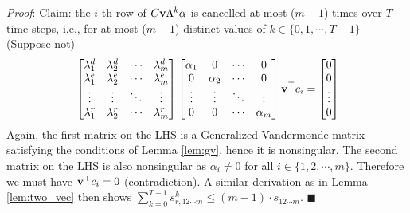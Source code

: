 \documentclass[../thesis.tex]{subfiles}
\begin{document}
\textit{Proof}:
Claim: the $i$-th row of $C{\bf v}\Lambda^k \alpha$ is cancelled at most ($m-1$) times over $T$ time steps, i.e., for at most ($m-1$) distinct values of $k \in \{0, 1, \cdots, T-1\}$
(Suppose not)
\begin{equation}
\begin{aligned}
	&	%
		\begin{bmatrix} \lambda_1^d & \lambda_2^d & \cdots & \lambda_m^d \\
					\lambda_1^e & \lambda_2^e & \cdots & \lambda_m^e \\
					\vdots & \vdots & \ddots & \vdots \\
					\lambda_1^r& \lambda_2^r & \cdots & \lambda_m^r 
		\end{bmatrix} %
		\begin{bmatrix} \alpha_1 & 0 & \cdots & 0 \\ 0 & \alpha_2 & \cdots & 0 \\ 
					\vdots & \vdots & \ddots & \vdots \\
					0 & 0 & \cdots & \alpha_m \end{bmatrix} 
					{\bf v}^\top c_i 
		= \begin{bmatrix} 0 \\ 0 \\ \vdots \\ 0 \end{bmatrix} \nonumber\\
\end{aligned}
\end{equation}
Again, the first matrix on the LHS is a Generalized Vandermonde matrix satisfying the conditions of Lemma \ref{lem:gv}, hence it is nonsingular. The second matrix on the LHS is also nonsingular as $\alpha_i \neq 0$ for all $i \in \{1, 2, \cdots, m\}$. Therefore we must have ${\bf v}^\top c_i = 0$ (contradiction). A similar derivation as in Lemma \ref{lem:two_vec} then shows $\sum_{k=0}^{T-1} s_{r,12\cdots m}^ k \le (m-1) \cdot s_{12\cdots m}$.
\hfill$\blacksquare$
\end{document}
